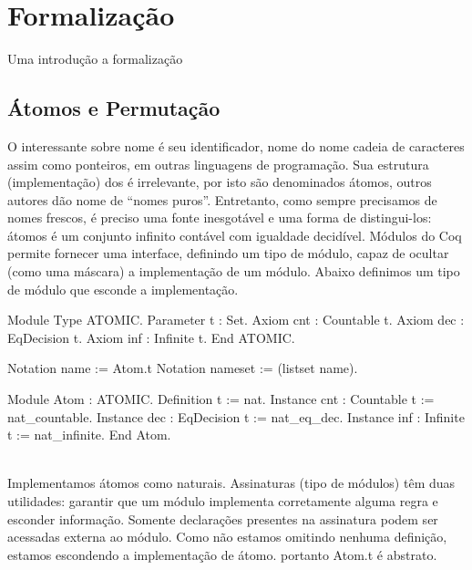 \chapter{Formalização}\label{chp:formalizacao}

Uma introdução a formalização

\section{Átomos e Permutação}
O interessante sobre nome é seu identificador, nome do nome cadeia de caracteres assim como ponteiros, em outras linguagens de programação. Sua estrutura (implementação) dos é irrelevante, por isto são denominados átomos, outros autores dão nome de ``nomes puros''. Entretanto, como sempre precisamos de nomes frescos, é preciso uma fonte inesgotável e uma forma de distingui-los: átomos é um conjunto infinito contável com igualdade decidível. Módulos do Coq permite fornecer uma interface, definindo um tipo de módulo, capaz de ocultar (como uma máscara) a implementação de um módulo. Abaixo definimos um tipo de módulo  que esconde a implementação.
\vspace*{.4em}\\
\begin{minipage}[t]{0.5\linewidth}
\begin{coqcode}
Module Type ATOMIC.
  Parameter t : Set.
  Axiom cnt : Countable t.
  Axiom dec : EqDecision t.
  Axiom inf : Infinite t.
End ATOMIC.

Notation name := Atom.t
Notation nameset := (listset name).
\end{coqcode}
\end{minipage}
\hspace{-5em}
\begin{minipage}[t]{0.5\linewidth}
\begin{coqcode}
Module Atom : ATOMIC.
  Definition t := nat.
  Instance cnt : Countable t := nat_countable.
  Instance dec : EqDecision t := nat_eq_dec.
  Instance inf : Infinite t := nat_infinite.
End Atom.
\end{coqcode}
\end{minipage}
\vspace*{1em}\\
Implementamos átomos como naturais.
Assinaturas (tipo de módulos) têm duas utilidades: garantir que um módulo implementa corretamente alguma regra e esconder informação. Somente declarações presentes na assinatura podem ser acessadas externa ao módulo. Como não estamos omitindo nenhuma definição, estamos escondendo a implementação de átomo. portanto Atom.t é abstrato.
